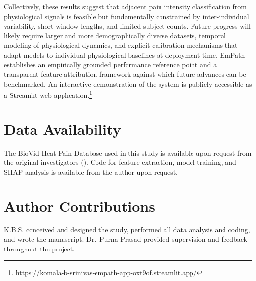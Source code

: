 \documentclass[10pt, twocolumn]{article}
\begin{document}
Collectively, these results suggest that adjacent pain intensity classification from
physiological signals is feasible but fundamentally constrained by inter-individual
variability, short window lengths, and limited subject counts. Future progress will likely
require larger and more demographically diverse datasets, temporal modeling of physiological
dynamics, and explicit calibration mechanisms that adapt models to individual physiological
baselines at deployment time. EmPath establishes an empirically grounded performance
reference point and a transparent feature attribution framework against which future
advances can be benchmarked. An interactive demonstration of the system is publicly
accessible as a Streamlit web application.\footnote{\url{https://komala-b-srinivas-empath-app-oxt9of.streamlit.app/}}

\section*{Data Availability}

The BioVid Heat Pain Database used in this study is available upon request from the
original investigators (\cite{Walter2013}). Code for feature extraction, model training,
and SHAP analysis is available from the author upon request.

\section*{Author Contributions}

K.B.S. conceived and designed the study, performed all data analysis and coding, and wrote
the manuscript. Dr.~Purna Prasad provided supervision and feedback throughout the project.

\printbibliography[title={References}]
\end{document}
